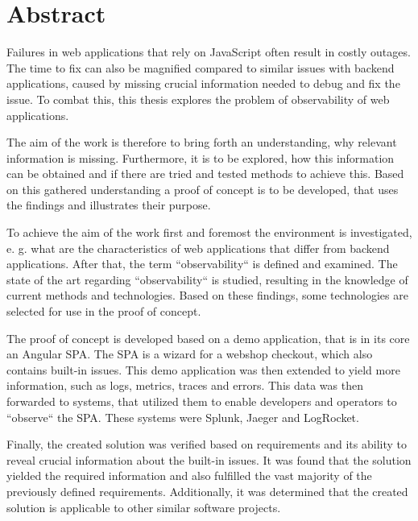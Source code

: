 \newpage{}

\section*{\thispagestyle{empty}Abstract}

Failures in web applications that rely on JavaScript often result in costly outages. The time to fix can also be magnified compared to similar issues with backend applications, caused by missing crucial information needed to debug and fix the issue. To combat this, this thesis explores the problem of observability of web applications.

The aim of the work is therefore to bring forth an understanding, why relevant information is missing. Furthermore, it is to be explored, how this information can be obtained and if there are tried and tested methods to achieve this. Based on this gathered understanding a proof of concept is to be developed, that uses the findings and illustrates their purpose.

To achieve the aim of the work first and foremost the environment is investigated, e. g. what are the characteristics of web applications that differ from backend applications. After that, the term ``observability`` is defined and examined. The state of the art regarding ``observability`` is studied, resulting in the knowledge of current methods and technologies. Based on these findings, some technologies are selected for use in the proof of concept.

The proof of concept is developed based on a demo application, that is in its core an Angular SPA. The SPA is a wizard for a webshop checkout, which also contains built-in issues. This demo application was then extended to yield more information, such as logs, metrics, traces and errors. This data was then forwarded to systems, that utilized them to enable developers and operators to ``observe`` the SPA. These systems were Splunk, Jaeger and LogRocket.

Finally, the created solution was verified based on requirements and its ability to reveal crucial information about the built-in issues. It was found that the solution yielded the required information and also fulfilled the vast majority of the previously defined requirements. Additionally, it was determined that the created solution is applicable to other similar software projects.